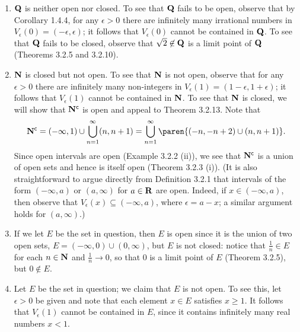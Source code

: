 \documentclass{lew98_solutions}
\begin{document}
\begin{solution}
    \begin{enumerate}
        \item \( \mathbf{Q} \) is neither open nor closed. To see that \( \mathbf{Q} \) fails to be open, observe that by Corollary 1.4.4, for any \( \epsilon > 0 \) there are infinitely many irrational numbers in \( V_{\epsilon}(0) = (-\epsilon, \epsilon) \); it follows that \( V_{\epsilon}(0) \) cannot be contained in \( \mathbf{Q} \). To see that \( \mathbf{Q} \) fails to be closed, observe that \( \sqrt{2} \not\in \mathbf{Q} \) is a limit point of \( \mathbf{Q} \) (Theorems 3.2.5 and 3.2.10).

        \item \( \mathbf{N} \) is closed but not open. To see that \( \mathbf{N} \) is not open, observe that for any \( \epsilon > 0 \) there are infinitely many non-integers in \( V_{\epsilon}(1) = (1 - \epsilon, 1 + \epsilon) \); it follows that \( V_{\epsilon}(1) \) cannot be contained in \( \mathbf{N} \). To see that \( \mathbf{N} \) is closed, we will show that \( \mathbf{N}^{\mathsf{c}} \) is open and appeal to Theorem 3.2.13. Note that
        \[
            \setcomp{\N} = (-\infty, 1) \cup \bigcup_{n=1}^{\infty} (n, n + 1) = \bigcup_{n=1}^{\infty} \paren{ (-n, -n + 2) \cup (n, n + 1) }.
        \]
        Since open intervals are open (Example 3.2.2 (ii)), we see that \( \mathbf{N}^{\mathsf{c}} \) is a union of open sets and hence is itself open (Theorem 3.2.3 (i)). (It is also straightforward to argue directly from Definition 3.2.1 that intervals of the form \( (-\infty, a) \) or \( (a, \infty) \) for \( a \in \mathbf{R} \) are open. Indeed, if \( x \in (-\infty, a) \), then observe that \( V_{\epsilon}(x) \subseteq (-\infty, a) \), where \( \epsilon = a - x \); a similar argument holds for \( (a, \infty) \).)

        \item If we let \( E \) be the set in question, then \( E \) is open since it is the union of two open sets, \( E = (-\infty, 0) \cup (0, \infty) \), but \( E \) is not closed: notice that \( \tfrac{1}{n} \in E \) for each \( n \in \mathbf{N} \) and \( \tfrac{1}{n} \to 0 \), so that 0 is a limit point of \( E \) (Theorem 3.2.5), but \( 0 \not\in E \).

        \item Let \( E \) be the set in question; we claim that \( E \) is not open. To see this, let \( \epsilon > 0 \) be given and note that each element \( x \in E \) satisfies \( x \geq 1 \). It follows that \( V_{\epsilon}(1) \) cannot be contained in \( E \), since it contains infinitely many real numbers \( x < 1 \).
        

\end{enumerate}
\end{solution}
\end{document}
